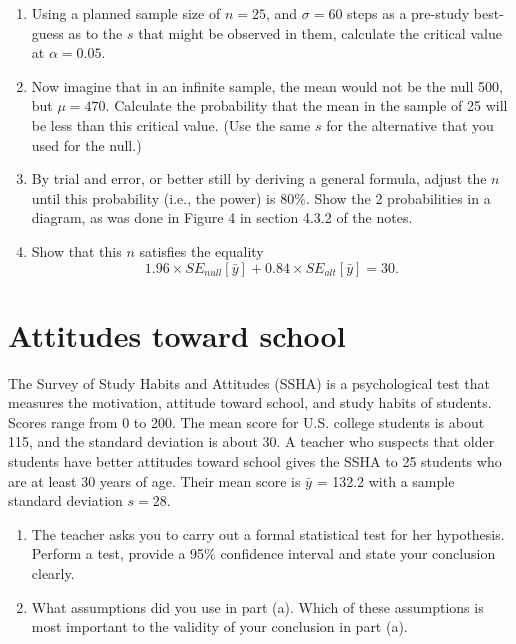 \documentclass[letterpaper,9pt,twoside,printwatermark=false]{pinp}
\providecommand{\tightlist}{%
  \setlength{\itemsep}{0pt}\setlength{\parskip}{0pt}}
\begin{document}
\begin{enumerate}
\item
Using a planned sample size of $n=25$, and $\sigma = 60$ steps as a pre-study best-guess as to the  $s$ that might  be observed in them, calculate the critical value at $\alpha = 0.05$.
\item
Now imagine that in an infinite sample,  the mean would not be the null 500, but $\mu=470.$
Calculate the probability that the mean in the sample of 25  will be less than this critical value. (Use the same $s$ for the alternative that you used for the null.)
\item
By trial and error, or better still by deriving a general formula, adjust the $n$ until this probability (i.e., the power) is 80\%. Show the 2 probabilities in a diagram, as was done in Figure 4 in section 4.3.2 of the notes.
\item Show that this $n$ satisfies the equality $$1.96\times SE_{null}[\bar{y}] + 0.84 \times SE_{alt}[\bar{y}] = 30.$$

\end{enumerate}

\newpage

\section{Attitudes toward school}\label{attitudes-toward-school}

The Survey of Study Habits and Attitudes (SSHA) is a psychological test
that measures the motivation, attitude toward school, and study habits
of students. Scores range from 0 to 200. The mean score for U.S. college
students is about 115, and the standard deviation is about 30. A teacher
who suspects that older students have better attitudes toward school
gives the SSHA to 25 students who are at least 30 years of age. Their
mean score is \(\bar{y}\) = 132.2 with a sample standard deviation
\(s = 28\).

\begin{enumerate}
\def\labelenumi{\alph{enumi}.}
\tightlist
\item
  The teacher asks you to carry out a formal statistical test for her
  hypothesis. Perform a test, provide a 95\% confidence interval and
  state your conclusion clearly.
\item
  What assumptions did you use in part (a). Which of these assumptions
  is most important to the validity of your conclusion in part (a).
\end{enumerate}
\end{document}
